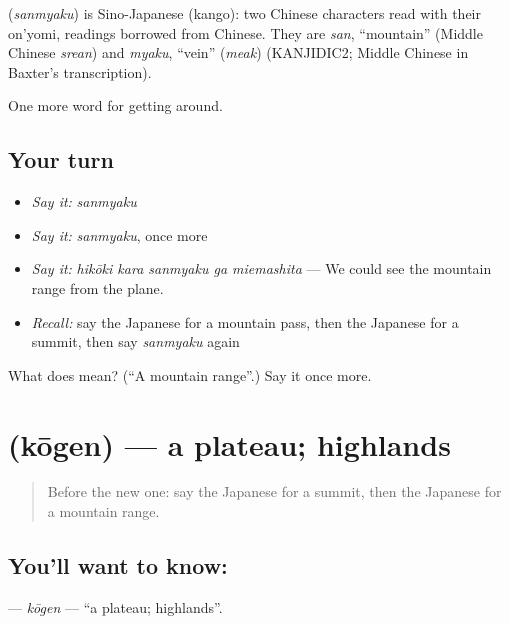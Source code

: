 \begin{cousinweb}
\textbf{} (\emph{sanmyaku}) is Sino-Japanese (kango): two Chinese characters read with their on'yomi, readings borrowed from Chinese. They are \emph{san}, \textquotedblleft{}mountain\textquotedblright{} (Middle Chinese \emph{srean}) and \emph{myaku}, \textquotedblleft{}vein\textquotedblright{} (\emph{meak}) (KANJIDIC2; Middle Chinese in Baxter's transcription).
\end{cousinweb}

\begin{grammarlens}[title={What you've built}]
One more word for getting around.
\end{grammarlens}

\subsection*{Your turn}
\begin{itemize}
\raggedright
  \item \emph{Say it:} \emph{sanmyaku}
  \item \emph{Say it:} \emph{sanmyaku}, once more
  \item \emph{Say it:} \emph{hikōki kara sanmyaku ga miemashita} — We could see the mountain range from the plane.
  \item \emph{Recall:} say the Japanese for a mountain pass, then the Japanese for a summit, then say \emph{sanmyaku} again
\end{itemize}

\begin{tcolorbox}[breakable,colback=teal!4,colframe=teal!35!black,title={Before you move on}]
What does  mean? (\textquotedblleft{}A mountain range\textquotedblright{}.) Say it once more.
\end{tcolorbox}
\section[\texorpdfstring{\ja{こうげん} (kōgen)}{こうげん (kōgen)}]{ (kōgen) — a plateau; highlands}

\label{lesson:JA-C412-kougen}



\begin{quote}
Before the new one: say the Japanese for a summit, then the Japanese for a mountain range.
\end{quote}

\subsection*{You'll want to know: }
\textbf{} — \emph{kōgen} — \textquotedblleft{}a plateau; highlands\textquotedblright{}.

